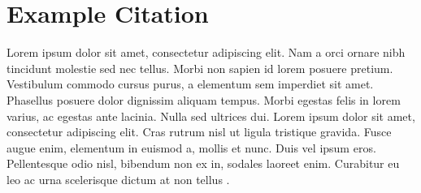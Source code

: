 \chapter{Example Citation}

Lorem ipsum dolor sit amet, consectetur adipiscing elit. Nam a orci ornare nibh tincidunt molestie sed nec tellus. Morbi non sapien id lorem posuere pretium. Vestibulum commodo cursus purus, a elementum sem imperdiet sit amet. Phasellus posuere dolor dignissim aliquam tempus. Morbi egestas felis in lorem varius, ac egestas ante lacinia. Nulla sed ultrices dui. Lorem ipsum dolor sit amet, consectetur adipiscing elit. Cras rutrum nisl ut ligula tristique gravida. Fusce augue enim, elementum in euismod a, mollis et nunc. Duis vel ipsum eros. Pellentesque odio nisl, bibendum non ex in, sodales laoreet enim. Curabitur eu leo ac urna scelerisque dictum at non tellus .
